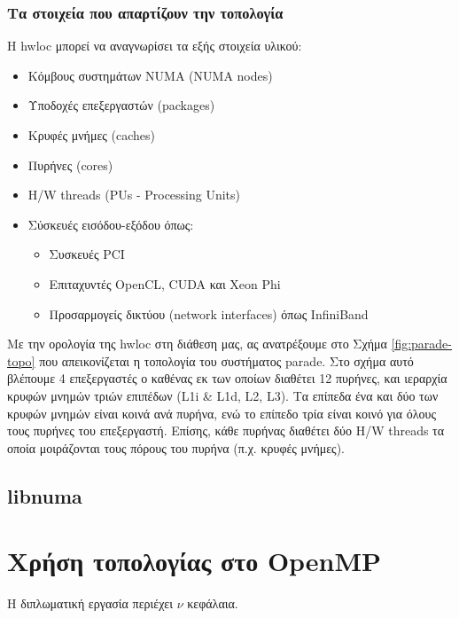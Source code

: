 \subsubsection{Τα στοιχεία που απαρτίζουν την τοπολογία}
Η hwloc μπορεί να αναγνωρίσει τα εξής στοιχεία υλικού:
\begin{itemize}
	\item Κόμβους συστημάτων NUMA (NUMA nodes)
	\item Υποδοχές επεξεργαστών (packages)
	\item Κρυφές μνήμες (caches)
	\item Πυρήνες (cores)
	\item H/W threads (PUs - Processing Units)
	\item Σύσκευές εισόδου-εξόδου όπως:
	\begin{itemize}
		\item Συσκευές PCI
		\item Επιταχυντές OpenCL, CUDA και Xeon Phi
		\item Προσαρμογείς δικτύου (network interfaces) όπως InfiniBand	
	\end{itemize}
\end{itemize}

Με την ορολογία της hwloc στη διάθεση μας, ας ανατρέξουμε στο Σχήμα \ref{fig:parade-topo} που απεικονίζεται η τοπολογία του συστήματος parade. Στο σχήμα αυτό βλέπουμε 4 επεξεργαστές ο καθένας εκ των οποίων διαθέτει 12 πυρήνες, και ιεραρχία κρυφών μνημών τριών επιπέδων (L1i \& L1d, L2, L3). Τα επίπεδα ένα και δύο των κρυφών μνημών είναι κοινά ανά πυρήνα, ενώ το επίπεδο τρία είναι κοινό για όλους τους πυρήνες του επεξεργαστή. Επίσης, κάθε πυρήνας διαθέτει δύο H/W threads τα οποία μοιράζονται τους πόρους του πυρήνα (π.χ. κρυφές μνήμες).


\subsection{libnuma}



\section{Χρήση τοπολογίας στο OpenMP}
\label{sec:Topology in OpenMP}
Η διπλωματική εργασία περιέχει $\nu$ κεφάλαια.
